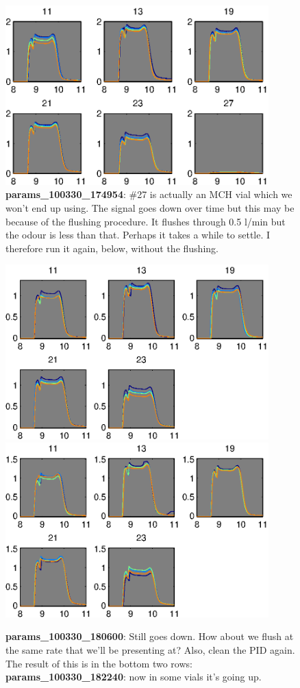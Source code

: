 \documentclass[a4paper]{report}
\begin{document}
\begin{figure}[h]
\centering
\includegraphics[width=4in]{params_100330_174954.eps}
\caption{\textbf{params\_100330\_174954}: \#27 is actually an MCH vial
which we won't end up using. The signal goes down over time but this
may be because of the flushing procedure. It flushes through 0.5 l/min
but the odour is less than that. Perhaps it takes a while to settle. I
therefore run it again, below, without the flushing. }
\end{figure}

\begin{figure}[h]
\centering
\includegraphics[width=4in]{params_100330_180600.eps}
\includegraphics[width=4in]{params_100330_182240.eps}
\caption{\textbf{params\_100330\_180600}: Still goes down. How about
  we flush at the same rate that we'll be presenting at? Also, clean
  the PID again. The result of this is in the bottom two rows:
  \textbf{params\_100330\_182240}: now in some vials it's going up. }
\end{figure}
\end{document}
